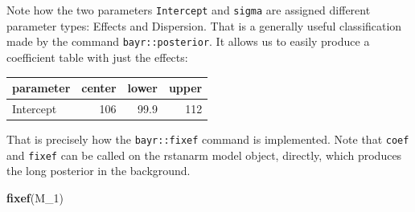 \documentclass[]{svmono}
\newenvironment{Shaded}{\begin{snugshade}}{\end{snugshade}}
\newcommand{\KeywordTok}[1]{\textcolor[rgb]{0.13,0.29,0.53}{\textbf{#1}}}
\newcommand{\DataTypeTok}[1]{\textcolor[rgb]{0.13,0.29,0.53}{#1}}
\newcommand{\DecValTok}[1]{\textcolor[rgb]{0.00,0.00,0.81}{#1}}
\newcommand{\StringTok}[1]{\textcolor[rgb]{0.31,0.60,0.02}{#1}}
\newcommand{\ControlFlowTok}[1]{\textcolor[rgb]{0.13,0.29,0.53}{\textbf{#1}}}
\newcommand{\OperatorTok}[1]{\textcolor[rgb]{0.81,0.36,0.00}{\textbf{#1}}}
\newcommand{\NormalTok}[1]{#1}
\begin{document}
Note how the two parameters \texttt{Intercept} and \texttt{sigma} are
assigned different parameter types: Effects and Dispersion. That is a
generally useful classification made by the command
\texttt{bayr::posterior}. It allows us to easily produce a coefficient
table with just the effects:

\begin{Shaded}
\end{Shaded}

\begin{Shaded}
\end{Shaded}

\begin{tabular}{l|r|r|r}
\hline
parameter & center & lower & upper\\
\hline
Intercept & 106 & 99.9 & 112\\
\hline
\end{tabular}

That is precisely how the \texttt{bayr::fixef} command is implemented.
Note that \texttt{coef} and \texttt{fixef} can be called on the rstanarm
model object, directly, which produces the long posterior in the
background.

\begin{Shaded}
\begin{Highlighting}[]
\KeywordTok{fixef}\NormalTok{(M_}\DecValTok{1}\NormalTok{)}
\end{Highlighting}
\end{Shaded}
\end{document}
